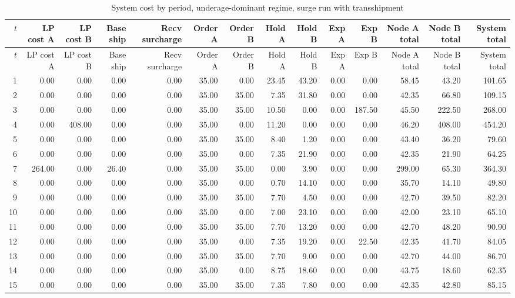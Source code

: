\documentclass[11pt]{article}
\begin{document}
\begin{landscape}
\begin{longtable}{rrrrrrrrrrrrrr}
\caption{System cost by period, underage-dominant regime, surge run with transshipment}\label{tab:appendix-underage-cost}\\
\toprule
$t$ & LP cost A & LP cost B & Base ship & Recv surcharge & Order A & Order B & Hold A & Hold B & Exp A & Exp B & Node A total & Node B total & System total \\
\midrule
\endfirsthead
\toprule
$t$ & LP cost A & LP cost B & Base ship & Recv surcharge & Order A & Order B & Hold A & Hold B & Exp A & Exp B & Node A total & Node B total & System total \\
\midrule
\endhead
1 & 0.00 & 0.00 & 0.00 & 0.00 & 35.00 & 0.00 & 23.45 & 43.20 & 0.00 & 0.00 & 58.45 & 43.20 & 101.65 \\
2 & 0.00 & 0.00 & 0.00 & 0.00 & 35.00 & 35.00 & 7.35 & 31.80 & 0.00 & 0.00 & 42.35 & 66.80 & 109.15 \\
3 & 0.00 & 0.00 & 0.00 & 0.00 & 35.00 & 35.00 & 10.50 & 0.00 & 0.00 & 187.50 & 45.50 & 222.50 & 268.00 \\
4 & 0.00 & 408.00 & 0.00 & 0.00 & 35.00 & 0.00 & 11.20 & 0.00 & 0.00 & 0.00 & 46.20 & 408.00 & 454.20 \\
5 & 0.00 & 0.00 & 0.00 & 0.00 & 35.00 & 35.00 & 8.40 & 1.20 & 0.00 & 0.00 & 43.40 & 36.20 & 79.60 \\
6 & 0.00 & 0.00 & 0.00 & 0.00 & 35.00 & 0.00 & 7.35 & 21.90 & 0.00 & 0.00 & 42.35 & 21.90 & 64.25 \\
7 & 264.00 & 0.00 & 26.40 & 0.00 & 35.00 & 35.00 & 0.00 & 3.90 & 0.00 & 0.00 & 299.00 & 65.30 & 364.30 \\
8 & 0.00 & 0.00 & 0.00 & 0.00 & 35.00 & 0.00 & 0.70 & 14.10 & 0.00 & 0.00 & 35.70 & 14.10 & 49.80 \\
9 & 0.00 & 0.00 & 0.00 & 0.00 & 35.00 & 35.00 & 7.70 & 4.50 & 0.00 & 0.00 & 42.70 & 39.50 & 82.20 \\
10 & 0.00 & 0.00 & 0.00 & 0.00 & 35.00 & 0.00 & 7.00 & 23.10 & 0.00 & 0.00 & 42.00 & 23.10 & 65.10 \\
11 & 0.00 & 0.00 & 0.00 & 0.00 & 35.00 & 35.00 & 7.70 & 13.20 & 0.00 & 0.00 & 42.70 & 48.20 & 90.90 \\
12 & 0.00 & 0.00 & 0.00 & 0.00 & 35.00 & 0.00 & 7.35 & 19.20 & 0.00 & 22.50 & 42.35 & 41.70 & 84.05 \\
13 & 0.00 & 0.00 & 0.00 & 0.00 & 35.00 & 35.00 & 7.70 & 9.00 & 0.00 & 0.00 & 42.70 & 44.00 & 86.70 \\
14 & 0.00 & 0.00 & 0.00 & 0.00 & 35.00 & 0.00 & 8.75 & 18.60 & 0.00 & 0.00 & 43.75 & 18.60 & 62.35 \\
15 & 0.00 & 0.00 & 0.00 & 0.00 & 35.00 & 35.00 & 7.35 & 7.80 & 0.00 & 0.00 & 42.35 & 42.80 & 85.15 \\
\bottomrule
\end{longtable}


\end{landscape}
\end{document}
